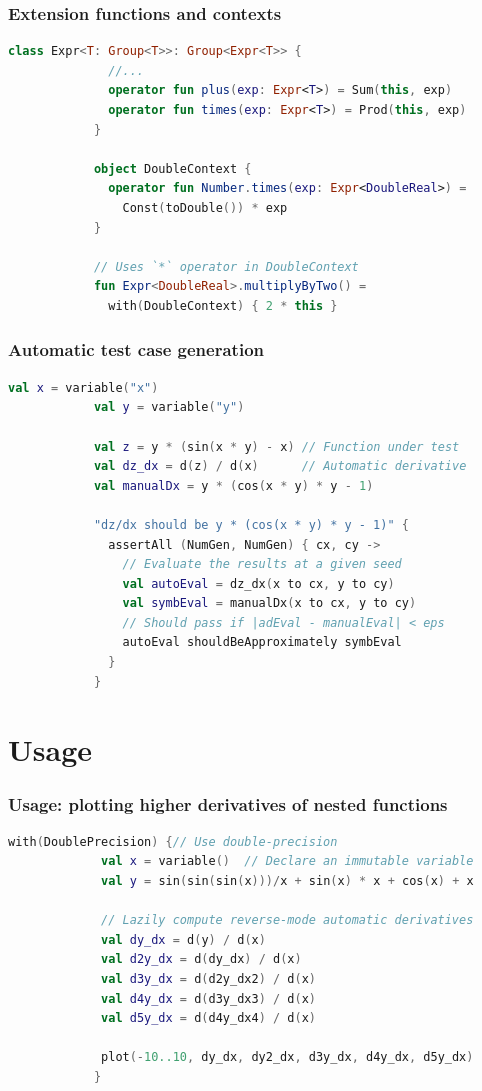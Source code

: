 \documentclass{beamer}
\begin{document}
    \begin{frame}[fragile]
        \frametitle{Extension functions and contexts}
        \begin{lstlisting}[language=Kotlin, gobble=12]
            class Expr<T: Group<T>>: Group<Expr<T>> {
              //...
              operator fun plus(exp: Expr<T>) = Sum(this, exp)
              operator fun times(exp: Expr<T>) = Prod(this, exp)
            }

            object DoubleContext {
              operator fun Number.times(exp: Expr<DoubleReal>) =
                Const(toDouble()) * exp
            }

            // Uses `*` operator in DoubleContext
            fun Expr<DoubleReal>.multiplyByTwo() =
              with(DoubleContext) { 2 * this }
        \end{lstlisting}
    \end{frame}

    \begin{frame}[fragile]
        \frametitle{Automatic test case generation}
        \begin{lstlisting}[language=Kotlin, gobble=12]
            val x = variable("x")
            val y = variable("y")

            val z = y * (sin(x * y) - x) // Function under test
            val dz_dx = d(z) / d(x)      // Automatic derivative
            val manualDx = y * (cos(x * y) * y - 1)

            "dz/dx should be y * (cos(x * y) * y - 1)" {
              assertAll (NumGen, NumGen) { cx, cy ->
                // Evaluate the results at a given seed
                val autoEval = dz_dx(x to cx, y to cy)
                val symbEval = manualDx(x to cx, y to cy)
                // Should pass if |adEval - manualEval| < eps
                autoEval shouldBeApproximately symbEval
              }
            }
        \end{lstlisting}
    \end{frame}

    \section{Usage}\label{sec:fourth-section}

    \begin{frame}[fragile]
        \frametitle{Usage: plotting higher derivatives of nested functions}
        \begin{lstlisting}[language=Kotlin, gobble=12]
            with(DoublePrecision) {// Use double-precision
             val x = variable()  // Declare an immutable variable
             val y = sin(sin(sin(x)))/x + sin(x) * x + cos(x) + x

             // Lazily compute reverse-mode automatic derivatives
             val dy_dx = d(y) / d(x)
             val d2y_dx = d(dy_dx) / d(x)
             val d3y_dx = d(d2y_dx2) / d(x)
             val d4y_dx = d(d3y_dx3) / d(x)
             val d5y_dx = d(d4y_dx4) / d(x)

             plot(-10..10, dy_dx, dy2_dx, d3y_dx, d4y_dx, d5y_dx)
            }
        \end{lstlisting}
    \end{frame}
\end{document}

